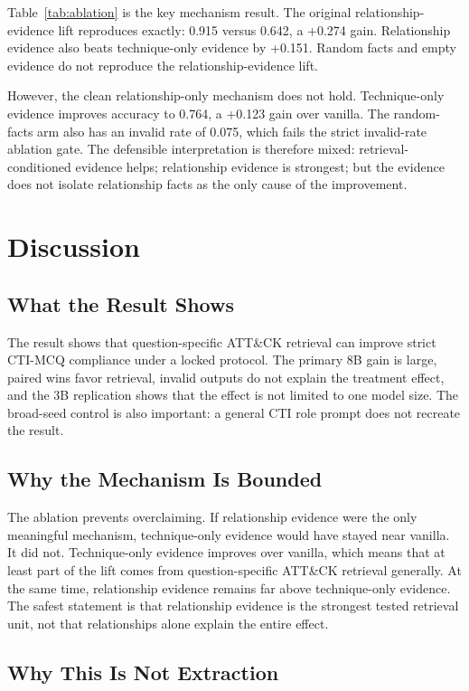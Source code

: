 \documentclass[10pt]{article}
\begin{document}
Table~\ref{tab:ablation} is the key mechanism result.
The original relationship-evidence lift reproduces exactly: 0.915 versus 0.642, a +0.274 gain.
Relationship evidence also beats technique-only evidence by +0.151.
Random facts and empty evidence do not reproduce the relationship-evidence lift.

However, the clean relationship-only mechanism does not hold.
Technique-only evidence improves accuracy to 0.764, a +0.123 gain over vanilla.
The random-facts arm also has an invalid rate of 0.075, which fails the strict invalid-rate ablation gate.
The defensible interpretation is therefore mixed:
retrieval-conditioned evidence helps; relationship evidence is strongest; but the evidence does not isolate relationship facts as the only cause of the improvement.

\section{Discussion}

\subsection{What the Result Shows}

The result shows that question-specific ATT\&CK retrieval can improve strict CTI-MCQ compliance under a locked protocol.
The primary 8B gain is large, paired wins favor retrieval, invalid outputs do not explain the treatment effect, and the 3B replication shows that the effect is not limited to one model size.
The broad-seed control is also important: a general CTI role prompt does not recreate the result.

\subsection{Why the Mechanism Is Bounded}

The ablation prevents overclaiming.
If relationship evidence were the only meaningful mechanism, technique-only evidence would have stayed near vanilla.
It did not.
Technique-only evidence improves over vanilla, which means that at least part of the lift comes from question-specific ATT\&CK retrieval generally.
At the same time, relationship evidence remains far above technique-only evidence.
The safest statement is that relationship evidence is the strongest tested retrieval unit, not that relationships alone explain the entire effect.

\subsection{Why This Is Not Extraction}
\end{document}
